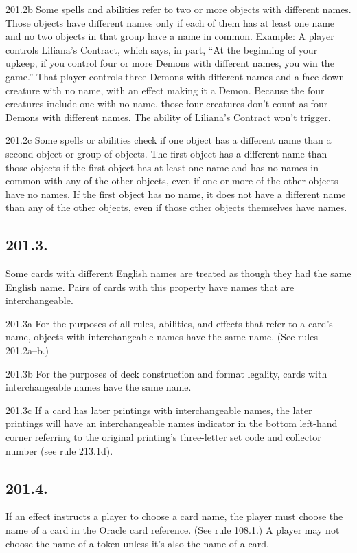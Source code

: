 201.2b Some spells and abilities refer to two or more objects with different names. Those objects have different names only if each of them has at least one name and no two objects in that group have a name in common.
Example: A player controls Liliana’s Contract, which says, in part, “At the beginning of your upkeep, if you control four or more Demons with different names, you win the game.” That player controls three Demons with different names and a face-down creature with no name, with an effect making it a Demon. Because the four creatures include one with no name, those four creatures don’t count as four Demons with different names. The ability of Liliana’s Contract won’t trigger.

201.2c Some spells or abilities check if one object has a different name than a second object or group of objects. The first object has a different name than those objects if the first object has at least one name and has no names in common with any of the other objects, even if one or more of the other objects have no names. If the first object has no name, it does not have a different name than any of the other objects, even if those other objects themselves have names.

\subsection*{201.3.}
Some cards with different English names are treated as though they had the same English name. Pairs of cards with this property have names that are interchangeable.

201.3a For the purposes of all rules, abilities, and effects that refer to a card’s name, objects with interchangeable names have the same name. (See rules 201.2a–b.)

201.3b For the purposes of deck construction and format legality, cards with interchangeable names have the same name.

201.3c If a card has later printings with interchangeable names, the later printings will have an interchangeable names indicator in the bottom left-hand corner referring to the original printing’s three-letter set code and collector number (see rule 213.1d).

\subsection*{201.4.}
If an effect instructs a player to choose a card name, the player must choose the name of a card in the Oracle card reference. (See rule 108.1.) A player may not choose the name of a token unless it’s also the name of a card.

